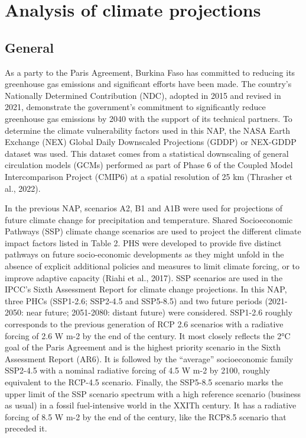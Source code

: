 \documentclass[
]{book}
\begin{document}
\section{Analysis of climate projections}\label{analysis-of-climate-projections}

\subsection{General}\label{general}

As a party to the Paris Agreement, Burkina Faso has committed to reducing its greenhouse gas emissions and significant efforts have been made. The country's Nationally Determined Contribution (NDC), adopted in 2015 and revised in 2021, demonstrate the government's commitment to significantly reduce greenhouse gas emissions by 2040 with the support of its technical partners. To determine the climate vulnerability factors used in this NAP, the NASA Earth Exchange (NEX) Global Daily Downscaled Projections (GDDP) or NEX-GDDP dataset was used. This dataset comes from a statistical downscaling of general circulation models (GCMs) performed as part of Phase 6 of the Coupled Model Intercomparison Project (CMIP6) at a spatial resolution of 25 km (Thrasher et al., 2022).

In the previous NAP, scenarios A2, B1 and A1B were used for projections of future climate change for precipitation and temperature. Shared Socioeconomic Pathways (SSP) climate change scenarios are used to project the different climate impact factors listed in Table 2. PHS were developed to provide five distinct pathways on future socio-economic developments as they might unfold in the absence of explicit additional policies and measures to limit climate forcing, or to improve adaptive capacity (Riahi et al., 2017). SSP scenarios are used in the IPCC's Sixth Assessment Report for climate change projections. In this NAP, three PHCs (SSP1-2.6; SSP2-4.5 and SSP5-8.5) and two future periods (2021-2050: near future; 2051-2080: distant future) were considered. SSP1-2.6 roughly corresponds to the previous generation of RCP 2.6 scenarios with a radiative forcing of 2.6 W m-2 by the end of the century. It most closely reflects the 2°C goal of the Paris Agreement and is the highest priority scenario in the Sixth Assessment Report (AR6). It is followed by the ``average'' socioeconomic family SSP2-4.5 with a nominal radiative forcing of 4.5 W m-2 by 2100, roughly equivalent to the RCP-4.5 scenario. Finally, the SSP5-8.5 scenario marks the upper limit of the SSP scenario spectrum with a high reference scenario (business as usual) in a fossil fuel-intensive world in the XXITh century. It has a radiative forcing of 8.5 W m-2 by the end of the century, like the RCP8.5 scenario that preceded it.
\end{document}

